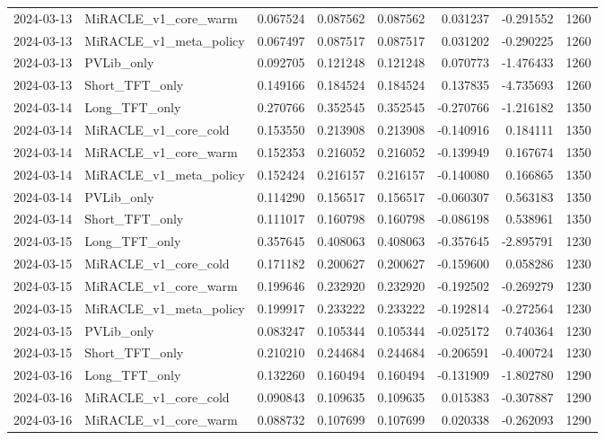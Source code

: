\begin{tabular}{llrrrrrr}
2024-03-13 & MiRACLE_v1_core_warm & 0.067524 & 0.087562 & 0.087562 & 0.031237 & -0.291552 & 1260 \\
2024-03-13 & MiRACLE_v1_meta_policy & 0.067497 & 0.087517 & 0.087517 & 0.031202 & -0.290225 & 1260 \\
2024-03-13 & PVLib_only & 0.092705 & 0.121248 & 0.121248 & 0.070773 & -1.476433 & 1260 \\
2024-03-13 & Short_TFT_only & 0.149166 & 0.184524 & 0.184524 & 0.137835 & -4.735693 & 1260 \\
2024-03-14 & Long_TFT_only & 0.270766 & 0.352545 & 0.352545 & -0.270766 & -1.216182 & 1350 \\
2024-03-14 & MiRACLE_v1_core_cold & 0.153550 & 0.213908 & 0.213908 & -0.140916 & 0.184111 & 1350 \\
2024-03-14 & MiRACLE_v1_core_warm & 0.152353 & 0.216052 & 0.216052 & -0.139949 & 0.167674 & 1350 \\
2024-03-14 & MiRACLE_v1_meta_policy & 0.152424 & 0.216157 & 0.216157 & -0.140080 & 0.166865 & 1350 \\
2024-03-14 & PVLib_only & 0.114290 & 0.156517 & 0.156517 & -0.060307 & 0.563183 & 1350 \\
2024-03-14 & Short_TFT_only & 0.111017 & 0.160798 & 0.160798 & -0.086198 & 0.538961 & 1350 \\
2024-03-15 & Long_TFT_only & 0.357645 & 0.408063 & 0.408063 & -0.357645 & -2.895791 & 1230 \\
2024-03-15 & MiRACLE_v1_core_cold & 0.171182 & 0.200627 & 0.200627 & -0.159600 & 0.058286 & 1230 \\
2024-03-15 & MiRACLE_v1_core_warm & 0.199646 & 0.232920 & 0.232920 & -0.192502 & -0.269279 & 1230 \\
2024-03-15 & MiRACLE_v1_meta_policy & 0.199917 & 0.233222 & 0.233222 & -0.192814 & -0.272564 & 1230 \\
2024-03-15 & PVLib_only & 0.083247 & 0.105344 & 0.105344 & -0.025172 & 0.740364 & 1230 \\
2024-03-15 & Short_TFT_only & 0.210210 & 0.244684 & 0.244684 & -0.206591 & -0.400724 & 1230 \\
2024-03-16 & Long_TFT_only & 0.132260 & 0.160494 & 0.160494 & -0.131909 & -1.802780 & 1290 \\
2024-03-16 & MiRACLE_v1_core_cold & 0.090843 & 0.109635 & 0.109635 & 0.015383 & -0.307887 & 1290 \\
2024-03-16 & MiRACLE_v1_core_warm & 0.088732 & 0.107699 & 0.107699 & 0.020338 & -0.262093 & 1290 \\

\end{tabular}
